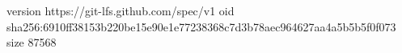 version https://git-lfs.github.com/spec/v1
oid sha256:6910ff38153b220be15e90e1e77238368c7d3b78aec964627aa4a5b5b5f0f073
size 87568
